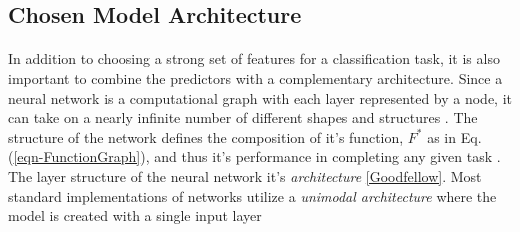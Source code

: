 \documentclass[12pt,letterpaper]{article}
\begin{document}
\subsection{Chosen Model Architecture}
\label{sec-Architecture}

\paragraph*{}In addition to choosing a strong set of features for a classification task, it is also important to combine the predictors with a complementary architecture. Since a neural network is a computational graph with each layer represented by a node, it can take on a nearly infinite number of different shapes and structures \cite{Goodfellow,Virtanen}. The structure of the network defines the composition of it's function, $F^*$ as in Eq.(\ref{eqn-FunctionGraph}), and thus it's performance in completing any given task \cite{Geron}. The layer structure of the neural network it's \textit{architecture} \ref{Goodfellow}. Most standard implementations of networks utilize a \textit{unimodal architecture} where the model is created with a single input layer \cite{N}
\end{document}
